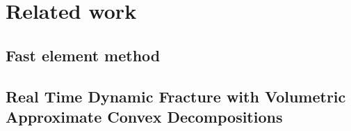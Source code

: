 \chapter{Related work}

\section{Fast element method}

\section{Real Time Dynamic Fracture
with Volumetric Approximate Convex Decompositions}

\section{}
